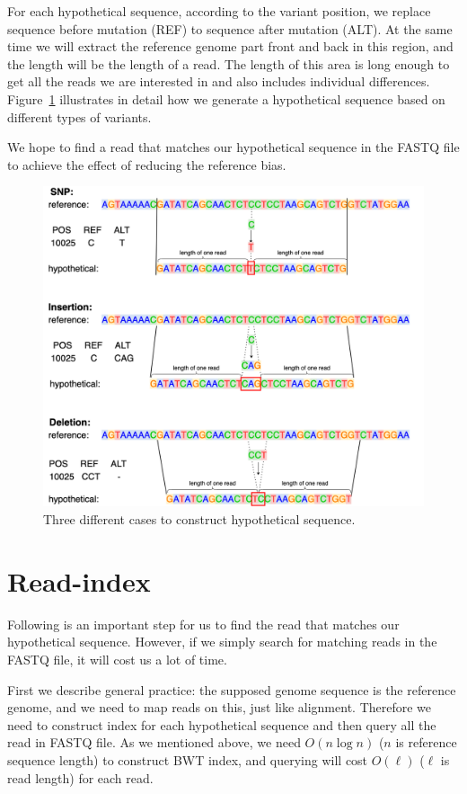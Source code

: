For each hypothetical sequence, according to the variant position, we replace sequence before mutation (REF) to sequence after mutation (ALT). At the same time we will extract the reference genome part front and back in this region, and the length will be the length of a read. The length of this area is long enough to get all the reads we are interested in and also includes individual differences. Figure~\ref{construct-hyposeq} illustrates in detail how we generate a hypothetical sequence based on different types of variants.

We hope to find a read that matches our hypothetical sequence in the FASTQ file to achieve the effect of reducing the reference bias.

\begin{figure}[H]
\includegraphics[width=1\columnwidth]{body/image/construct-hyposeq.png}
\caption[construct hypothetical sequence]{Three different cases to construct hypothetical sequence.}
\label{construct-hyposeq}
\end{figure}

\section{Read-index}

Following is an important step for us to find the read that matches our hypothetical sequence. However, if we simply search for matching reads in the FASTQ file, it will cost us a lot of time. 

First we describe general practice: the supposed genome sequence is the reference genome, and we need to map reads on this, just like alignment. Therefore we need to construct index for each hypothetical sequence and then query all the read in FASTQ file. As we mentioned above, we need $O(n\log n)$  ($n$ is reference sequence length) to construct BWT index, and querying will cost $O(\ell)$ ($\ell$ is read length) for each read.

